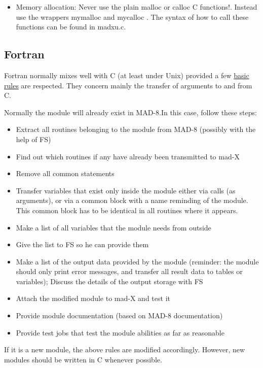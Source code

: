 \begin{itemize}
  \item  Memory allocation: Never use the plain malloc or calloc C
    functions!. Instead use the wrappers  mymalloc and mycalloc . The
    syntax of how to call these functions can be found in madxu.c.  
\end{itemize}

\subsection{Fortran} 
Fortran normally mixes well with C (at least under Unix) provided a few
\href{fortran-rules.html}{basic rules} are respected. They concern
mainly the transfer of arguments to and from C.  

Normally the module will already exist in MAD-8.In this case, follow
these steps:  
\begin{itemize}
\item Extract all routines belonging to the module from MAD-8 (possibly
  with the help of FS)  
\item Find out which routines if any have already been transmitted to
  mad-X  
\item Remove all common statements
\item Transfer variables that exist only inside the module either via
  calls (as arguments), or via a common block with a name reminding of
  the module. This common block has to be identical in all routines
  where it appears.  
\item Make a list of all variables that the module needs from outside  
\item Give the list to FS so he can provide them 
\item Make a list of the output data provided by the module (reminder:
  the module should only print error messages,  and transfer all result
  data to tables or variables); Discuss the details of the output
  storage with FS  
\item Attach the modified module to mad-X and test it 
\item Provide module documentation (based on MAD-8 documentation) 
\item Provide test jobs that test the module abilities as far as
  reasonable  
\end{itemize} 
If it is a new module, the above rules are modified
accordingly. However, new modules should be written in C whenever
possible.  



